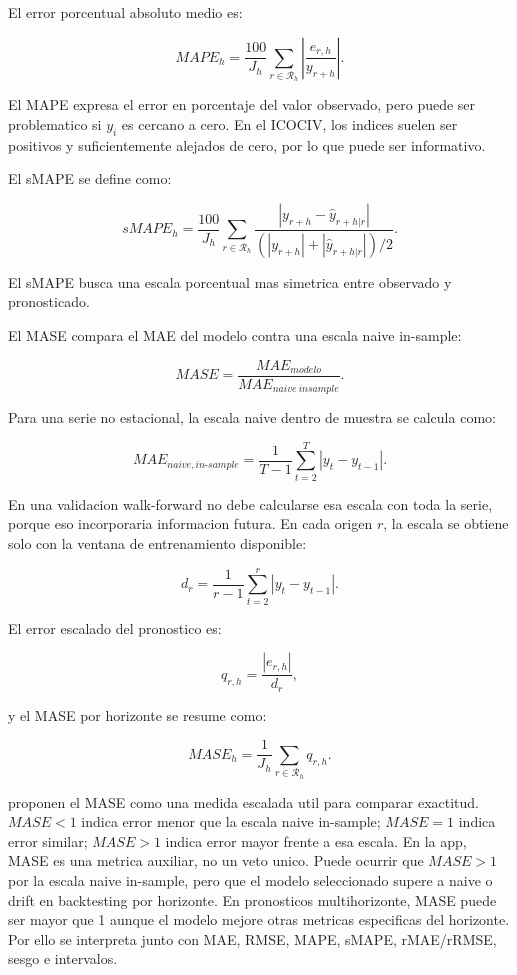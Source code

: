 ﻿\documentclass[12pt,letterpaper]{article}
\newcommand{\ICOCIV}{ICOCIV}
\newcommand{\yhat}{\hat{y}}
\newcommand{\MAE}{MAE}
\newcommand{\MAPE}{MAPE}
\newcommand{\SMAPE}{sMAPE}
\begin{document}
El error porcentual absoluto medio es:

\[
MAPE_h =
\frac{100}{J_h}
\sum_{r\in\mathcal{R}_h}
\left|
\frac{e_{r,h}}{y_{r+h}}
\right|.
\]

El \MAPE{} expresa el error en porcentaje del valor observado, pero puede ser problematico si \(y_i\) es cercano a cero. En el \ICOCIV{}, los indices suelen ser positivos y suficientemente alejados de cero, por lo que puede ser informativo.

El sMAPE se define como:

\[
sMAPE_h =
\frac{100}{J_h}
\sum_{r\in\mathcal{R}_h}
\frac{
|y_{r+h}-\yhat_{r+h|r}|
}{
(|y_{r+h}|+|\yhat_{r+h|r}|)/2
}.
\]

El \SMAPE{} busca una escala porcentual mas simetrica entre observado y pronosticado.

El MASE compara el \MAE{} del modelo contra una escala naive in-sample:

\[
MASE=\frac{MAE_{modelo}}{MAE_{naive\ insample}}.
\]

Para una serie no estacional, la escala naive dentro de muestra se calcula como:

\[
MAE_{naive,in\text{-}sample}
=
\frac{1}{T-1}
\sum_{t=2}^{T}|y_t-y_{t-1}|.
\]

En una validacion walk-forward no debe calcularse esa escala con toda la serie, porque eso incorporaria informacion futura. En cada origen \(r\), la escala se obtiene solo con la ventana de entrenamiento disponible:

\[
d_r=
\frac{1}{r-1}
\sum_{t=2}^{r}|y_t-y_{t-1}|.
\]

El error escalado del pronostico es:

\[
q_{r,h}=\frac{|e_{r,h}|}{d_r},
\]

y el MASE por horizonte se resume como:

\[
MASE_h=
\frac{1}{J_h}
\sum_{r \in \mathcal{R}_h}q_{r,h}.
\]

\citet{hyndman_koehler2006} proponen el MASE como una medida escalada util para comparar exactitud. \(MASE<1\) indica error menor que la escala naive in-sample; \(MASE=1\) indica error similar; \(MASE>1\) indica error mayor frente a esa escala. En la app, MASE es una metrica auxiliar, no un veto unico. Puede ocurrir que \(MASE>1\) por la escala naive in-sample, pero que el modelo seleccionado supere a naive o drift en backtesting por horizonte. En pronosticos multihorizonte, MASE puede ser mayor que 1 aunque el modelo mejore otras metricas especificas del horizonte. Por ello se interpreta junto con MAE, RMSE, MAPE, sMAPE, rMAE/rRMSE, sesgo e intervalos.
\end{document}
